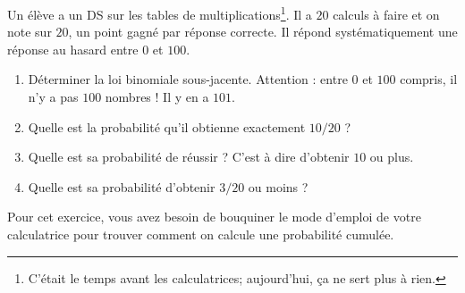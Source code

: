 
\begin{exercice}\label{exoPremiere-0087}

    Un élève a un DS sur les tables de multiplications\footnote{C'était le temps avant les calculatrices; aujourd'hui, ça ne sert plus à rien.}. Il a \( 20\) calculs à faire et on note sur \( 20\), un point gagné par réponse correcte. Il répond systématiquement une réponse au hasard entre \( 0\) et \( 100\).
    \begin{enumerate}
        \item
            Déterminer la loi binomiale sous-jacente. Attention : entre \( 0\) et \( 100\) compris, il n'y a pas \( 100\) nombres ! Il y en a \( 101\).
        \item
            Quelle est la probabilité qu'il obtienne exactement  \( 10/20\) ?
        \item
            Quelle est sa probabilité de réussir ? C'est à dire d'obtenir \( 10\) ou plus.
        \item
            Quelle est sa probabilité d'obtenir \( 3/20\) ou moins ?
    \end{enumerate}
    Pour cet exercice, vous avez besoin de bouquiner le mode d'emploi de votre calculatrice pour trouver comment on calcule une probabilité cumulée.

\end{exercice}
